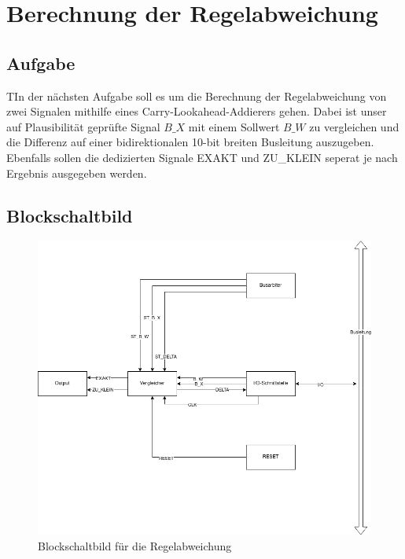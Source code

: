 \documentclass{report}
\begin{document}
\renewcommand{\thechapter}{B}

\chapter{Berechnung der Regelabweichung}
\label{cha:berechn-der-regel}
\newpage
\section{Aufgabe}
\label{sec:einleitung-1}

\begin{task}
  TIn der nächsten Aufgabe soll es um die Berechnung der Regelabweichung von zwei Signalen mithilfe eines Carry-Lookahead-Addierers gehen. Dabei ist unser auf Plausibilität geprüfte Signal $B\_X$ mit einem Sollwert $B\_{W}$ zu vergleichen und die Differenz auf einer bidirektionalen 10-bit breiten Busleitung auszugeben. Ebenfalls sollen die dedizierten Signale EXAKT und ZU\_KLEIN seperat je nach Ergebnis ausgegeben werden.

\end{task}


\section{Blockschaltbild}
\label{sec:blockschaltbild-1}

\begin{figure}[h]
  \centering
  \includegraphics[width=\textwidth]{../assets/images/DIHA/delta.png}
  \caption{Blockschaltbild für die Regelabweichung}
  \label{fig:blockregel}
\end{figure}
\end{document}
